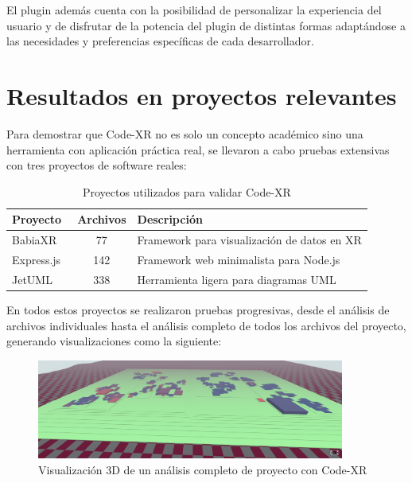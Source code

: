 \documentclass[a4paper, 12pt]{book}
\begin{document}
El plugin además cuenta con la posibilidad de personalizar la experiencia del usuario y de disfrutar de la potencia del plugin de distintas formas adaptándose a las necesidades y preferencias específicas de cada desarrollador.

\section{Resultados en proyectos relevantes}
\label{sec:resultados-proyectos}

Para demostrar que Code-XR no es solo un concepto académico sino una herramienta con aplicación práctica real, se llevaron a cabo pruebas extensivas con tres proyectos de software reales:

\begin{table}[h]
\centering
\begin{tabular}{|l|c|l|}
\hline
\textbf{Proyecto} & \textbf{Archivos} & \textbf{Descripción} \\
\hline
BabiaXR~\cite{moreno2022babiaxr} & 77 & Framework para visualización de datos en XR \\
\hline
Express.js~\cite{expressjs2022web} & 142 & Framework web minimalista para Node.js \\
\hline
JetUML~\cite{jetuml2022web} & 338 & Herramienta ligera para diagramas UML \\
\hline
\end{tabular}
\caption{Proyectos utilizados para validar Code-XR}
\label{tab:proyectos-validacion}
\end{table}

En todos estos proyectos se realizaron pruebas progresivas, desde el análisis de archivos individuales hasta el análisis completo de todos los archivos del proyecto, generando visualizaciones como la siguiente:


\begin{figure}[H]
\centering
\includegraphics[width=0.9\textwidth]{img/analisis-proyecto-completo.png}
\caption{Visualización 3D de un análisis completo de proyecto con Code-XR}
\label{fig:analisis-proyecto-completo}
\end{figure}
\end{document}

